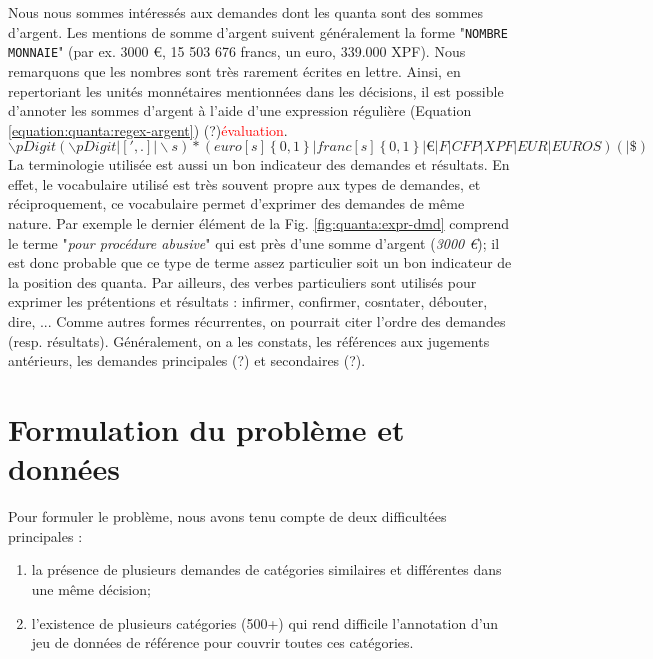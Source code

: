 Nous nous sommes intéressés aux demandes dont les quanta sont des sommes d'argent. Les mentions de somme d'argent suivent généralement la forme "\verb=NOMBRE MONNAIE=" (par ex. 3000 \euro{}, 15 503 676 francs, un euro, 339.000 XPF). Nous remarquons que les nombres sont très rarement écrites en lettre. Ainsi, en repertoriant les unités monnétaires mentionnées dans les décisions, il est possible d'annoter les sommes d'argent à l'aide d'une expression régulière (Equation \ref{equation:quanta:regex-argent}) (?)\textcolor{red}{évaluation}.
\begin{equation} %
    \backslash p{Digit}(\backslash p{Digit}|[',.]|\backslash s)*(euro[s]\left\{0,1\right\}|franc[s]\left\{0,1\right\}|\euro{}|F|CFP|XPF|EUR|EUROS)( |\$)\label{equation:quanta:regex-argent} %
\end{equation}
La terminologie utilisée est aussi un bon indicateur des demandes et résultats. En effet, le vocabulaire utilisé est très souvent propre aux types de demandes, et réciproquement, ce vocabulaire permet d'exprimer des demandes de même nature. Par exemple le dernier élément de la Fig. \ref{fig:quanta:expr-dmd} comprend le terme "\textit{pour procédure abusive}" qui est près d'une somme d'argent (\textit{3000 \euro{}}); il est donc probable que ce type de terme assez particulier soit un bon indicateur de la position des quanta. Par ailleurs, des verbes particuliers sont utilisés pour exprimer les prétentions et résultats : infirmer, confirmer, cosntater, débouter, dire, ... Comme autres formes récurrentes, on pourrait citer l'ordre des demandes (resp. résultats). Généralement, on a les constats, les références aux jugements antérieurs, les demandes principales (?) et secondaires (?).

\section{Formulation du problème et données}
\label{sec:quanta:formulation}
Pour formuler le problème, nous avons tenu compte de deux difficultées principales :
\begin{enumerate}
    \item la présence de plusieurs demandes de catégories similaires et différentes dans une même décision;
    \item l'existence de plusieurs catégories (500+) qui rend difficile l'annotation d'un jeu de données de référence pour couvrir toutes ces catégories.
\end{enumerate}

